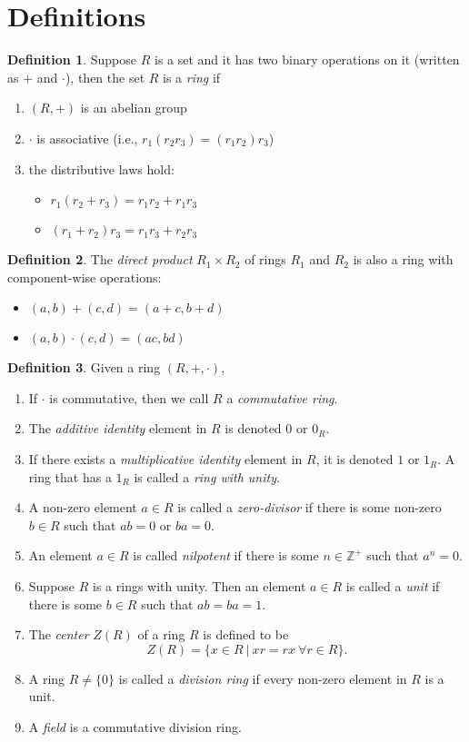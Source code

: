 \documentclass[12pt]{article}
\newcommand{\enumarabic}[1]{
	\begin{enumerate}[label=\textbf{\arabic*.}]
		#1
	\end{enumerate}
}
\theoremstyle{definition}
\newtheorem*{defn}{Definition}
\newcommand{\Z}{\mathbb{Z}}
\newcommand{\bulletize}[1]{%
	\begin{itemize}
		#1
	\end{itemize}
}
\begin{document}
\section*{Definitions}

\begin{defn}
	Suppose $R$ is a set and it has two binary operations on it (written as $+$ and $\cdot$), then the set $R$ is a \emph{ring} if 
	\enumarabic{
		\item $(R,+)$ is an abelian group
		\item $\cdot$ is associative (i.e., $r_1(r_2r_3)=(r_1r_2)r_3$)
		\item the distributive laws hold:
		\bulletize{\item $r_1(r_2+r_3)=r_1r_2+r_1r_3$\item $(r_1+r_2)r_3=r_1r_3+r_2r_3$}
	}
\end{defn}
\begin{defn}
	The \emph{direct product} $R_1\times R_2$ of rings $R_1$ and $R_2$ is also a ring with component-wise operations:
	\bulletize{\item $(a,b)+(c,d)=(a+c,b+d)$\item $(a,b)\cdot(c,d)=(ac,bd)$} 
\end{defn}
\begin{defn}
	Given a ring $(R,+,\cdot)$,
	\enumarabic{
		\item If $\cdot$ is commutative, then we call $R$ a \emph{commutative ring}.
		\item The \emph{additive identity} element in $R$ is denoted $0$ or $0_R$.
		\item If there exists a \emph{multiplicative identity} element in $R$, it is denoted $1$ or $1_R$.  A ring that has a $1_R$ is called a \emph{ring with unity}.
		\item A non-zero element $a\in R$ is called a \emph{zero-divisor} if there is some non-zero $b\in R$ such that $ab=0$ or $ba=0$.
		\item An element $a\in R$ is called \emph{nilpotent} if there is some $n\in \Z^+$ such that $a^n=0$.
		\item Suppose $R$ is a rings with unity.  Then an element $a\in R$ is called a \emph{unit} if there is some $b\in R$ such that $ab=ba=1$.
		\item The \emph{center} $Z(R)$ of a ring $R$ is defined to be 
		\[Z(R)=\{x\in R\ |\ xr=rx\ \forall r\in R\}.\]
		\item A ring $R\neq\{0\}$ is called a \emph{division ring} if every non-zero element in $R$ is a unit.
		\item A \emph{field} is a commutative division ring.
	}
\end{defn}
\end{document}
